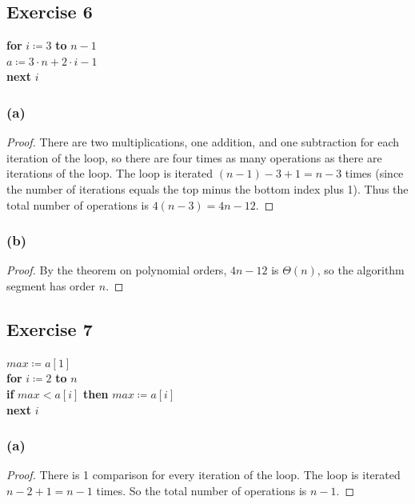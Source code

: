 \documentclass[14pt]{extarticle}
\begin{document}
\subsection{Exercise 6}
\begin{tabbing}
    {\bf for} \= \(i \coloneqq 3\) {\bf to} \(n-1\) \\
    \> \(a \coloneqq 3 \cdot n + 2 \cdot i - 1\) \\
    {\bf next} \(i\)
\end{tabbing}

\subsubsection{(a)}
\begin{proof}
    There are two multiplications, one addition, and one subtraction for each iteration of the loop, so there are four
    times as many operations as there are iterations of the loop. The loop is iterated \((n - 1) - 3 + 1 = n - 3\) times (since
    the number of iterations equals the top minus the bottom index plus 1). Thus the total number of operations is
    \(4(n - 3) = 4n - 12\).
\end{proof}

\subsubsection{(b)}
\begin{proof}
    By the theorem on polynomial orders, \(4n - 12\) is \(\Theta(n)\), so the algorithm segment has order \(n\).
\end{proof}

\subsection{Exercise 7}
\begin{tabbing}
    \(max \coloneqq a[1]\) \\
    {\bf for} \= \(i \coloneqq 2\) {\bf to} \(n\) \\
    \> {\bf if} \(max < a[i]\) {\bf then} \(max \coloneqq a[i]\) \\
    {\bf next} \(i\)
\end{tabbing}

\subsubsection{(a)}
\begin{proof}
    There is 1 comparison for every iteration of the loop. The loop is iterated \(n-2+1 = n-1\) times. So the total number of
    operations is \(n-1\).
\end{proof}
\end{document}
